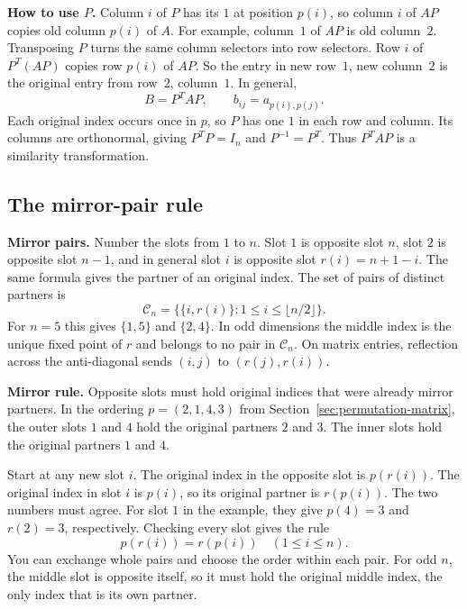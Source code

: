 \documentclass[11pt,a4paper]{article}
\begin{document}
\textbf{How to use $P$.}
Column $i$ of $P$ has its $1$ at position $p(i)$, so column $i$ of $AP$
copies old column $p(i)$ of $A$. For example, column~$1$ of $AP$ is
old column~$2$. Transposing $P$ turns the same column selectors into
row selectors. Row $i$ of $P^T(AP)$ copies row $p(i)$ of $AP$.
So the entry in new row~$1$, new column~$2$ is the original entry from
row~$2$, column~$1$. In general,
\begin{equation}\label{eq:ordering}
 B=P^TAP,\qquad b_{ij}=a_{p(i),p(j)}.
\end{equation}
Each original index occurs once in $p$, so $P$ has one $1$ in each row
and column. Its columns are orthonormal, giving $P^TP=I_n$ and $P^{-1}=P^T$.
Thus $P^TAP$ is a similarity transformation.

\newpage
\subsection{The mirror-pair rule}
\textbf{Mirror pairs.}
Number the slots from $1$ to $n$. Slot $1$ is opposite slot $n$,
slot $2$ is opposite slot $n-1$, and in general slot $i$ is opposite
slot $r(i)=n+1-i$. The same formula gives the partner of an original index.
The set of pairs of distinct partners is
\[
 \mathcal C_n=\bigl\{\{i,r(i)\}:1\leq i\leq \lfloor n/2\rfloor\bigr\}.
\]
For $n=5$ this gives $\{1,5\}$ and $\{2,4\}$. In odd dimensions the middle
index is the unique fixed point of $r$ and belongs to no pair in
$\mathcal C_n$. On matrix entries, reflection across the anti-diagonal
sends $(i,j)$ to $(r(j),r(i))$.

\textbf{Mirror rule.}
Opposite slots must hold original indices that were already mirror
partners. In the ordering $p=(2,1,4,3)$ from Section~\ref{sec:permutation-matrix}, the outer slots
$1$ and $4$ hold the original partners $2$ and $3$. The inner slots
hold the original partners $1$ and $4$.

Start at any new slot $i$. The original index in the opposite slot is
$p(r(i))$. The original index in slot $i$ is $p(i)$, so its original
partner is $r(p(i))$. The two numbers must agree. For slot $1$ in the
example, they give $p(4)=3$ and $r(2)=3$, respectively. Checking every
slot gives the rule
\begin{equation}\label{eq:pair-rule}
 \boxed{p(r(i))=r(p(i))\quad(1\leq i\leq n).}
\end{equation}
You can exchange whole pairs and choose the order within each pair.
For odd $n$, the middle slot is opposite itself, so it must hold the
original middle index, the only index that is its own partner.
\end{document}
